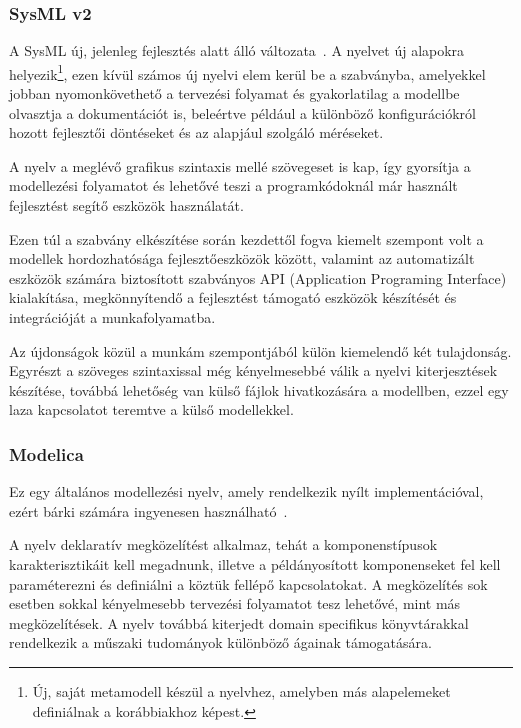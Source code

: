         \subsubsection{SysML v2}
        A SysML új, jelenleg fejlesztés alatt álló változata~\cite{Bajaj_2022}. A nyelvet új alapokra helyezik\footnote{Új, saját metamodell készül a nyelvhez, amelyben más alapelemeket definiálnak a korábbiakhoz képest.},
        ezen kívül számos új nyelvi elem kerül be a szabványba, amelyekkel jobban nyomonkövethető a tervezési folyamat és
        gyakorlatilag a modellbe olvasztja a dokumentációt is, beleértve például a különböző konfigurációkról
        hozott fejlesztői döntéseket és az alapjául szolgáló méréseket.
        
        A nyelv a meglévő grafikus szintaxis mellé szövegeset is kap, így gyorsítja a modellezési folyamatot és lehetővé teszi a programkódoknál már használt fejlesztést segítő eszközök használatát.

        Ezen túl a szabvány elkészítése során kezdettől fogva kiemelt szempont volt a modellek hordozhatósága fejlesztőeszközök között, valamint az automatizált eszközök számára biztosított szabványos API (Application Programing Interface) kialakítása, megkönnyítendő a fejlesztést támogató eszközök készítését és integrációját a munkafolyamatba.
        
        Az újdonságok közül a munkám szempontjából külön kiemelendő két tulajdonság. Egyrészt a szöveges szintaxissal még kényelmesebbé válik a nyelvi
        kiterjesztések készítése, továbbá lehetőség van külső fájlok hivatkozására a modellben, ezzel egy laza
        kapcsolatot teremtve a külső modellekkel.

        \subsubsection{Modelica}
        Ez egy általános modellezési nyelv, amely rendelkezik nyílt implementációval, ezért bárki számára
        ingyenesen használható~\cite{Modelica2023}.
        
        A nyelv deklaratív megközelítést alkalmaz, tehát a komponenstípusok
        karakterisztikáit kell megadnunk, illetve a példányosított komponenseket fel kell paraméterezni és
        definiálni a köztük fellépő kapcsolatokat. A megközelítés sok esetben sokkal kényelmesebb tervezési folyamatot
        tesz lehetővé, mint más megközelítések. A nyelv továbbá kiterjedt domain specifikus könyvtárakkal
        rendelkezik a műszaki tudományok különböző ágainak támogatására.

